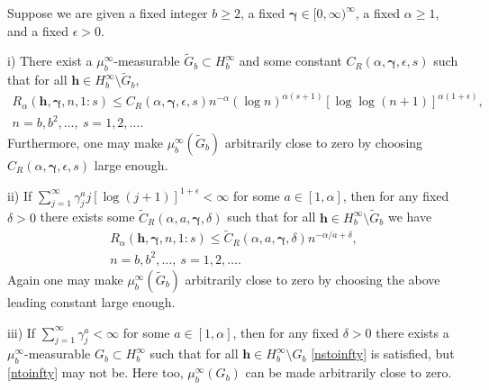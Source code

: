 \documentclass{article}
\renewcommand{\vec}[1]{\ensuremath{\mathbf{#1}}}
\newcommand{\vecsym}[1]{\ensuremath{\boldsymbol{#1}}}
\newcommand{\bfgam}{\vecsym \gamma}
\newcommand{\h}{\vec h}
\begin{document}
\begin{theorem} \label{Rthm} Suppose we are given a fixed integer $b \ge
2$, a fixed $\bfgam \in [0,\infty)^{\infty}$, a fixed $\alpha \ge 1$,
and a fixed $\epsilon > 0$.  

i) There exist a $\mu_b^{\infty}$-measurable $\tilde{G}_{b} \subset H_{b}^{\infty}$ and some constant
$C_{R}(\alpha,\bfgam,\epsilon,s)$ such that for all $\h \in
H_{b}^{\infty} \setminus \tilde{G}_{b}$,
\begin{multline} \label{ntoinfty}
    R_{\alpha}(\h,\bfgam,n,1:s) \le C_{R}(\alpha,\bfgam,\epsilon,s)
    n^{-\alpha} (\log n)^{\alpha(s+1)} [\log \log (
    n+1)]^{\alpha(1+\epsilon)}, \\ n=b, b^{2},\ldots,\ s=1,2,\ldots.
\end{multline}
Furthermore, one may make $\mu_{b}^{\infty}(\tilde{G}_{b})$ arbitrarily close to 
zero by choosing  $C_{R}(\alpha,\bfgam,\epsilon,s)$ large enough.

ii)  If $\sum_{j=1}^{\infty} \gamma_{j}^{a} j [\log(j+1)]^{1+\epsilon} < \infty$ for some
$a \in [1,\alpha]$, then for any fixed $\delta>0$ there exists some
$\tilde{C}_{R}(\alpha,a,\bfgam,\delta)$ such that for all $\h \in
H_{b}^{\infty} \setminus \tilde{G}_{b}$ we have
\begin{multline}\label{nstoinfty}
R_{\alpha}(\h,\bfgam,n,1:s) \le \tilde{C}_{R}(\alpha,a,\bfgam,\delta) 
n^{-\alpha/a+\delta}, \\
n=b,b^{2},\ldots,\ s=1,2,\ldots.
\end{multline}
Again one may make $\mu_{b}^{\infty}(\tilde{G}_{b})$ arbitrarily close to 
zero by choosing the above leading constant large enough.

iii)  If $\sum_{j=1}^{\infty} \gamma_{j}^{a} < \infty$ for some $a \in
[1,\alpha]$, then for any fixed $\delta>0$ there exists a
$\mu_b^{\infty}$-measurable $G_{b}
\subset H_{b}^{\infty}$ such that for all $\h \in  H_{b}^{\infty} \setminus 
G_{b}$ \eqref{nstoinfty} is satisfied, but \eqref{ntoinfty} may not 
be.  Here too, $\mu_{b}^{\infty}(G_{b})$ can be made arbitrarily close to 
zero.
\end{theorem}
\end{document}
